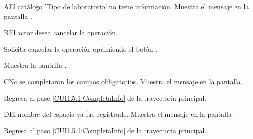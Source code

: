\begin{UCtrayectoriaA}{A}{El catálogo 'Tipo de laboratorio' no tiene información.}
	\UCpaso [\UCsist] Muestra el mensaje  en la pantalla . 
\end{UCtrayectoriaA}

\begin{UCtrayectoriaA}{B}{El actor desea cancelar la operación.}
	
	\UCpaso [\UCactor] Solicita cancelar la operación oprimiendo el botón .
	
	\UCpaso [\UCsist] Muestra la pantalla . 
\end{UCtrayectoriaA}

\begin{UCtrayectoriaA}{C}{No se completaron los campos obligatorios.}
	\UCpaso [\UCsist] Muestra el mensaje  en la pantalla .
	
	\UCpaso Regresa al paso \ref{CUI1.5.1:CompletaInfo} de la trayectoria principal.
\end{UCtrayectoriaA}

\begin{UCtrayectoriaA}{D}{El nombre del espacio ya fue registrado.}
	\UCpaso [\UCsist] Muestra el mensaje  en la pantalla .
	
	\UCpaso Regresa al paso \ref{CUI1.5.1:CompletaInfo} de la trayectoria principal.
\end{UCtrayectoriaA}